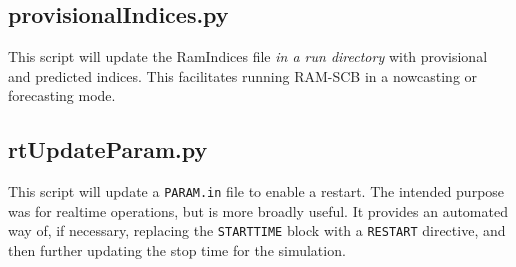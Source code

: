 \subsection{provisionalIndices.py}
This script will update the RamIndices file \textit{in a run directory} with provisional and predicted indices. This facilitates running RAM-SCB in a nowcasting or forecasting mode.

\subsection{rtUpdateParam.py}
This script will update a {\tt PARAM.in} file to enable a restart. The intended purpose was for realtime operations, but is more broadly useful. It provides an automated way of, if necessary, replacing the {\tt STARTTIME} block with a {\tt RESTART} directive, and then further updating the stop time for the simulation.